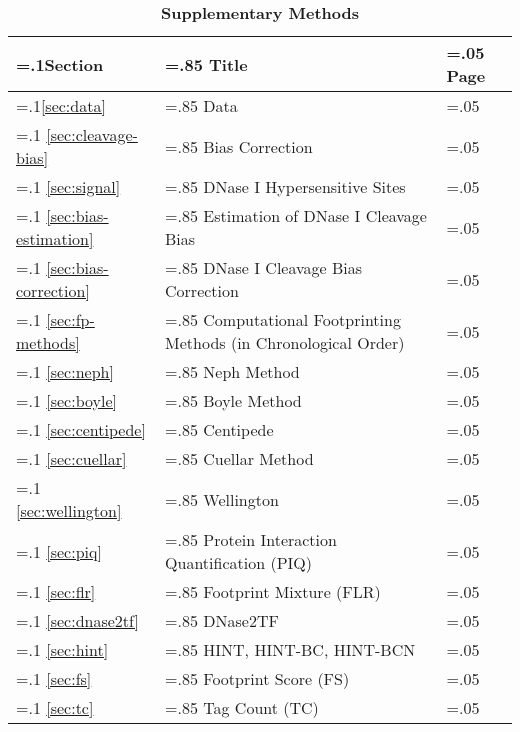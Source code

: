 \documentclass[11pt]{article}
\begin{document}
\begin{table*}[h!]
\small
\begin{flushleft}
\caption*{\textbf{{\small Supplementary Methods}}}
\vspace{-0.4cm}
\end{flushleft}
\begin{center}
\renewcommand{\arraystretch}{1.2}
\begin{tabularx}{\textwidth}{ |>{\hsize=.1\hsize}X|>{\hsize=.85\hsize}X|>{\hsize=.05\hsize}X| }
\hline
\textbf{Section} & \textbf{Title} & \textbf{Page} \\
\hline
\ref{sec:data} & Data  & \pageref{sec:data} \\
\hline
\ref{sec:cleavage-bias} & Bias Correction  & \pageref{sec:cleavage-bias} \\
\hline
\ref{sec:signal} & DNase I Hypersensitive Sites  & \pageref{sec:signal} \\
\hline
\ref{sec:bias-estimation} & Estimation of DNase I Cleavage Bias  & \pageref{sec:bias-estimation} \\
\hline
\ref{sec:bias-correction} & DNase I Cleavage Bias Correction  & \pageref{sec:bias-correction} \\
\hline
\ref{sec:fp-methods} & Computational Footprinting Methods (in Chronological Order)  & \pageref{sec:fp-methods} \\
\hline
\ref{sec:neph} & Neph Method  & \pageref{sec:neph} \\
\hline
\ref{sec:boyle} & Boyle Method  & \pageref{sec:boyle} \\
\hline
\ref{sec:centipede} & Centipede  & \pageref{sec:centipede} \\
\hline
\ref{sec:cuellar} & Cuellar Method  & \pageref{sec:cuellar} \\
\hline
\ref{sec:wellington} & Wellington  & \pageref{sec:wellington} \\
\hline
\ref{sec:piq} & Protein Interaction Quantification (PIQ)  & \pageref{sec:piq} \\
\hline
\ref{sec:flr} & Footprint Mixture (FLR)  & \pageref{sec:flr} \\
\hline
\ref{sec:dnase2tf} & DNase2TF  & \pageref{sec:dnase2tf} \\
\hline
\ref{sec:hint} & HINT, HINT-BC, HINT-BCN  & \pageref{sec:hint} \\
\hline
\ref{sec:fs} & Footprint Score (FS)  & \pageref{sec:fs} \\
\hline
\ref{sec:tc} & Tag Count (TC)  & \pageref{sec:tc} \\

\end{tabularx}
\end{center}
\end{table*}
\end{document}
